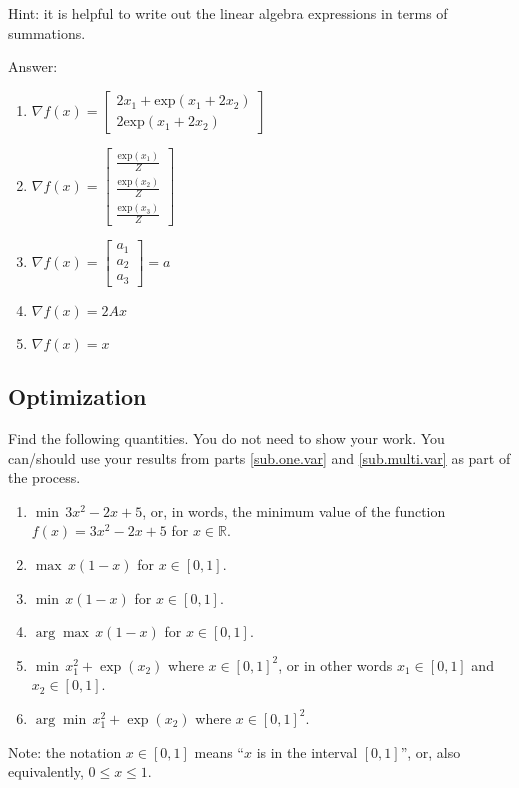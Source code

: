 \documentclass{article}
\def\blu#1{{\color{blu}#1}}
\def\red#1{{\color{red}#1}}
\def\R{\mathbb{R}}
\begin{document}
Hint: it is helpful to write out the linear algebra expressions in terms of summations.

\red{Answer:
\begin{enumerate}
\item $\nabla f(x) = \left[
\begin{array}{c}
2x_1+\text{exp}(x_1+2x_2)\\
2\text{exp}(x_1+2x_2)
\end{array}
\right]$
\item $\nabla f(x) = \left[
\begin{array}{c}
\frac{\text{exp}(x_1)}{Z}\\
\frac{\text{exp}(x_2)}{Z}\\
\frac{\text{exp}(x_3)}{Z}
\end{array}
\right]$
\item $\nabla f(x) = \left[\begin{array}{c}
a_1\\
a_2\\
a_3
\end{array}
\right]=a$
\item $\nabla f(x) = 2Ax$
\item $\nabla f(x) = x$
\end{enumerate}
}
\subsection{Optimization}
\blu{Find the following quantities.} You do not need to show your work.
You can/should use your results from parts \ref{sub.one.var} and \ref{sub.multi.var} as part of the process.

\begin{enumerate}
\item $\min \, 3x^2-2x+5$, or, in words, the minimum value of the function $f(x) = 3x^2 -2x + 5$ for $x \in \R$.
\item $\max \, x(1-x)$ for $x\in [0,1]$.
\item $\min \, x(1-x)$ for $x\in [0,1]$.
\item $\arg \max \, x(1-x)$ for $x\in[0,1]$.
\item $\min \, x_1^2 + \exp(x_2)$ where $x \in [0,1]^2$, or in other words $x_1\in [0,1]$ and $x_2\in [0,1]$.
\item $\arg \min \, x_1^2 + \exp(x_2)$ where $x \in [0,1]^2$.
\end{enumerate}

Note: the notation $x\in [0,1]$ means ``$x$ is in the interval $[0,1]$'', or, also equivalently, $0 \leq x \leq 1$.
\end{document}

